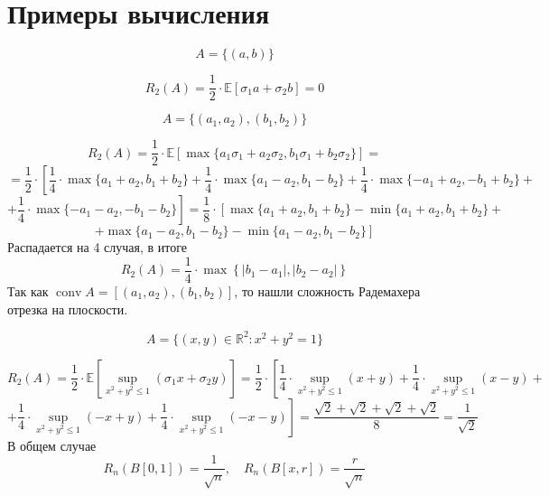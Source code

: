 \documentclass[12pt]{article}
\newtheorem{example}{\hskip\parindent Пример}%
\begin{document}
\section{Примеры вычисления}
\begin{example}
	\begin{equation*}
		A=\{(a,b)\}
	\end{equation*}
\end{example}
\begin{equation*}
	R_2(A)=\frac{1}{2}\cdot\mathbb{E}\left[\sigma_1 a+\sigma_2b\right]=0
\end{equation*}
\begin{example}
	\begin{equation*}
		A=\{(a_1,a_2), (b_1,b_2)\}
	\end{equation*}
\end{example}
\begin{equation*}
	R_2(A)=\frac{1}{2}\cdot\mathbb{E}\left[\max\{a_1\sigma_1+a_2\sigma_2,b_1\sigma_1+b_2\sigma_2\}\right]=
\end{equation*}
\begin{equation*}
	=\frac{1}{2}\cdot\left[\frac{1}{4}\cdot\max\{a_1+a_2,b_1+b_2\}+\frac{1}{4}\cdot\max\{a_1-a_2,b_1-b_2\}+\frac{1}{4}\cdot\max\{-a_1+a_2,-b_1+b_2\}+\right.
\end{equation*}
\begin{equation*}
	\left.+\frac{1}{4}\cdot\max\{-a_1-a_2,-b_1-b_2\}\right]=\frac{1}{8}\cdot\left[\max\{a_1+a_2,b_1+b_2\}-\min\{a_1+a_2,b_1+b_2\}+\right.
\end{equation*}
\begin{equation*}
	\left.+\max\{a_1-a_2,b_1-b_2\}-\min\{a_1-a_2,b_1-b_2\}\right]
\end{equation*}
Распадается на 4 случая, в итоге
\begin{equation*}
	R_2(A)=\frac{1}{4}\cdot\max\left\{|b_1-a_1|,|b_2-a_2|\right\}
\end{equation*}
Так как $\operatorname{conv}A=\left[(a_1,a_2), (b_1,b_2)\right]$, то нашли сложность Радемахера отрезка на плоскости.
\begin{example}
	\begin{equation*}
		A=\{(x,y)\in\mathbb{R}^2: x^2+y^2=1\}
	\end{equation*}
\end{example}
\begin{equation*}
	R_2(A)=\frac{1}{2}\cdot\mathbb{E}\left[\sup\limits_{x^2+y^2\leqslant 1}(\sigma_1x+\sigma_2y)\right]=\frac{1}{2}\cdot\left[\frac{1}{4}\cdot\sup\limits_{x^2+y^2\leqslant 1}(x+y)+\frac{1}{4}\cdot\sup\limits_{x^2+y^2\leqslant 1}(x-y)+\right.
\end{equation*}
\begin{equation*}
	\left.+\frac{1}{4}\cdot\sup\limits_{x^2+y^2\leqslant 1}(-x+y)+\frac{1}{4}\cdot\sup\limits_{x^2+y^2\leqslant 1}(-x-y)\right]=\frac{\sqrt{2}+\sqrt{2}+\sqrt{2}+\sqrt{2}}{8}=\frac{1}{\sqrt{2}}
\end{equation*}
В общем случае
\begin{equation*}
	R_n(B[0,1])=\dfrac{1}{\sqrt{n}}, \quad R_n(B[x,r])=\dfrac{r}{\sqrt{n}}
\end{equation*}
\end{document}
